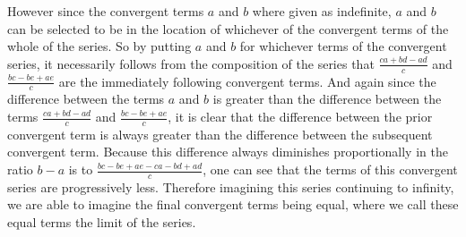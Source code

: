 \documentclass[11pt,letterpaper]{book}
\begin{document}
However since the convergent terms $a$ and $b$ where given as indefinite, $a$
and $b$ can be selected to be in the location of whichever of the convergent
terms of the whole of the series. So by putting $a$ and $b$ for whichever terms
of the convergent series, it necessarily follows from the composition of the
series that $\frac{ca+bd-ad}{c}$ and $\frac{bc-be+ae}{c}$ are the immediately
following convergent terms. And again since the difference between the terms $a$
and $b$ is greater than the difference between the terms $\frac{ca+bd-ad}{c}$
and $\frac{bc-be+ae}{c}$, it is clear that the difference between the
prior convergent term is always greater than the difference between the
subsequent convergent term. Because this difference always diminishes
proportionally in the ratio $b - a$ is to $\frac{bc - be + ae - ca - bd +
ad}{c}$, one can see that the terms of this convergent series are progressively
less. Therefore imagining this series continuing to infinity, we are able to
imagine the final convergent terms being equal, where we call these equal terms
the limit of the series.

\end{document}
